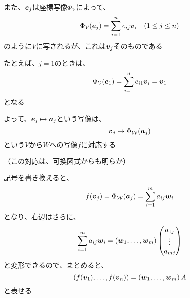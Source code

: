 \documentclass[../../../topic_linear-algebra]{subfiles}
\begin{document}
\br

また、$\vb*{e}_j$は座標写像$\Phi_{\mathcal{V}}$によって、
\begin{equation*}
  \Phi_{\mathcal{V}}(\vb*{e}_j) = \sum_{i=1}^n e_{ij} \vb*{v}_i \quad (1 \leq j \leq n)
\end{equation*}
のように$V$に写されるが、これは$\vb*{v}_j$そのものである

たとえば、$j=1$のときは、
\begin{equation*}
  \Phi_{\mathcal{V}}(\vb*{e}_1) = \sum_{i=1}^n e_{i1} \vb*{v}_i = \vb*{v}_1
\end{equation*}
となる

\br

よって、$\vb*{e}_j \mapsto \vb*{a}_j$という写像は、
\begin{equation*}
  \vb*{v}_j \mapsto \Phi_{\mathcal{W}}(\vb*{a}_j)
\end{equation*}
という$V$から$W$への写像$f$に対応する

（この対応は、可換図式からも明らか）

\br

記号を書き換えると、
\begin{equation*}
  f(\vb*{v}_j) = \Phi_{\mathcal{W}}(\vb*{a}_j) = \sum_{i=1}^m a_{ij} \vb*{w}_i
\end{equation*}
となり、右辺はさらに、
\begin{equation*}
  \sum_{i=1}^m a_{ij} \vb*{w}_i = (\vb*{w}_1, \ldots, \vb*{w}_m) \begin{pmatrix}
    a_{1j} \\
    \vdots \\
    a_{mj}
  \end{pmatrix}
\end{equation*}
と変形できるので、まとめると、
\begin{equation*}
  \left( f(\vb*{v}_1),\ldots, f(\vb*{v}_n) \right) = \left( \vb*{w}_1, \ldots, \vb*{w}_m \right) A
\end{equation*}
と表せる
\end{document}
